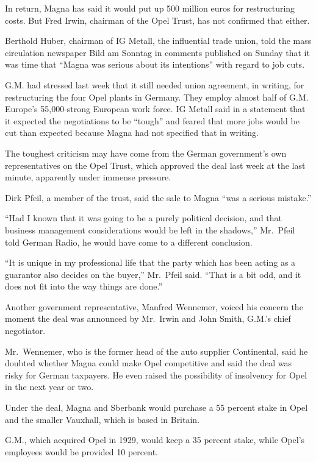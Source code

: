﻿\documentclass[12pt]{article}
\begin{document}
In return, Magna has said it would put up 500 million euros for restructuring costs. But Fred Irwin,
chairman of the Opel Trust, has not confirmed that either.

Berthold Huber, chairman of IG Metall, the influential trade union, told the mass circulation
newspaper Bild am Sonntag in comments published on Sunday that it was time that ``Magna was serious
about its intentions'' with regard to job cuts.

G.M. had stressed last week that it still needed union agreement, in writing, for restructuring the
four Opel plants in Germany. They employ almost half of G.M. Europe's 55,000-strong European work
force. IG Metall said in a statement that it expected the negotiations to be ``tough'' and feared
that more jobs would be cut than expected because Magna had not specified that in writing.

The toughest criticism may have come from the German government's own representatives on the Opel
Trust, which approved the deal last week at the last minute, apparently under immense pressure.

Dirk Pfeil, a member of the trust, said the sale to Magna ``was a serious mistake.''

``Had I known that it was going to be a purely political decision, and that business management
considerations would be left in the shadows,'' Mr.~Pfeil told German Radio, he would have come to a
different conclusion.

``It is unique in my professional life that the party which has been acting as a guarantor also
decides on the buyer,'' Mr.~Pfeil said. ``That is a bit odd, and it does not fit into the way things
are done.''

Another government representative, Manfred Wennemer, voiced his concern the moment the deal was
announced by Mr.~Irwin and John Smith, G.M.'s chief negotiator.

Mr.~Wennemer, who is the former head of the auto supplier Continental, said he doubted whether Magna
could make Opel competitive and said the deal was risky for German taxpayers. He even raised the
possibility of insolvency for Opel in the next year or two.

Under the deal, Magna and Sberbank would purchase a 55 percent stake in Opel and the smaller
Vauxhall, which is based in Britain.

G.M., which acquired Opel in 1929, would keep a 35 percent stake, while Opel's employees would be
provided 10 percent.
\end{document}
